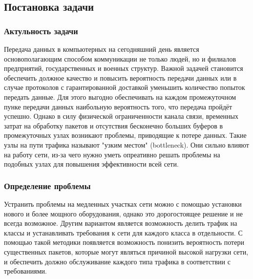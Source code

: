 	\subsection{Постановка задачи}
		\subsubsection{Актульность задачи}

        Передача данных в компьютерных на сегодняшний день является основополагающим
        способом коммуникации не только людей, но и филиалов предприятий, государственных
        и военных структур. Важной задачей становится обеспечить должное качество и повысить
        вероятность передачи данных или в случае протоколов с гарантированной доставкой
        уменьшить количество попыток передать данные. Для этого выгодно обеспечивать на 
        каждом промежуточном пунке передачи данных наибольную вероятность того, что передача
        пройдёт успешно. Однако в силу физической ограниченности канала связи,
        временных затрат на обработку пакетов и отсутствия бесконечно больших буферов в
        промежуточных узлах возникают проблемы, приводящие к потере данных. Такие узлы
        на пути трафика называют "узким местом" (bottleneck). Они сильно влияют на 
        работу сети, из-за чего нужно уметь опреативно решать проблемы на подобных узлах
        для повышения эффективности всей сети.

		
		\subsubsection{Определение проблемы}

    	Устранить проблемы на медленных участках сети можно с помощью установки нового
    	и более мощного оборудования, однако это дорогостоящее решение и не всегда возможное.
    	Другим вариантом является возможность делить трафик на классы и устанавливать
    	требования к сети для каждого класса в отдельности. С помощью такой методики
    	появляется возможность понизить вероятность потери существенных пакетов, которые
    	могут являться причиной высокой нагрузки сети, и обеспечить должно обслуживание
    	каждого типа трафика в соответствии с требованиями.

